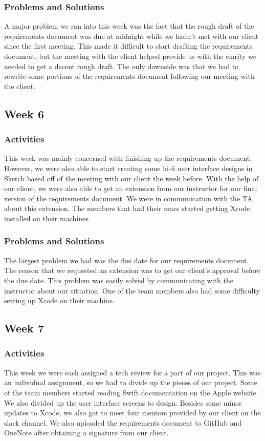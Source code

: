 \documentclass[onecolumn, draftclsnofoot,10pt, compsoc]{IEEEtran}
\begin{document}
\subsubsection{Problems and Solutions}
A major problem we ran into this week was the fact that the rough draft of the requirements document was due at midnight while we hadn’t met with our client since the first meeting. This made it difficult to start drafting the requirements document, but the meeting with the client helped provide us with the clarity we needed to get a decent rough draft. The only downside was that we had to rewrite some portions of the requirements document following our meeting with the client.
\subsection{Week 6}
\subsubsection{Activities}
This week was mainly concerned with finishing up the requirements document. However, we were also able to start creating some hi-fi user interface designs in Sketch based off of the meeting with our client the week before. With the help of our client, we were also able to get an extension from our instructor for our final version of the requirements document. We were in communication with the TA about this extension. The members that had their macs started getting Xcode installed on their machines.

\subsubsection{Problems and Solutions}
The largest problem we had was the due date for our requirements document. The reason that we requested an extension was to get our client’s approval before the due date. This problem was easily solved by communicating with the instructor about our situation. One of the team members also had some difficulty setting up Xcode on their machine.
\subsection{Week 7}
\subsubsection{Activities}
This week we were each assigned a tech review for a part of our project. This was an individual assignment, so we had to divide up the pieces of our project. Some of the team members started reading Swift documentation on the Apple website. We also divided up the user interface screens to design. Besides some minor updates to Xcode, we also got to meet four mentors provided by our client on the slack channel. We also uploaded the requirements document to GitHub and OneNote after obtaining a signature from our client.
\end{document}
